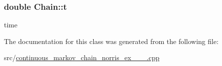 \subsubsection[{\texorpdfstring{t}{t}}]{\setlength{\rightskip}{0pt plus 5cm}double Chain\+::t}\hypertarget{classChain_a07bbad56f1ed3da3594326d8b14d1906}{}\label{classChain_a07bbad56f1ed3da3594326d8b14d1906}
time 

The documentation for this class was generated from the following file\+:\begin{DoxyCompactItemize}
\item 
src/\hyperlink{continuous__markov__chain__norris__ex__2__3__2_8cpp}{continuous\+\_\+markov\+\_\+chain\+\_\+norris\+\_\+ex\+\_\+\_\+\_.\+cpp}\end{DoxyCompactItemize}
